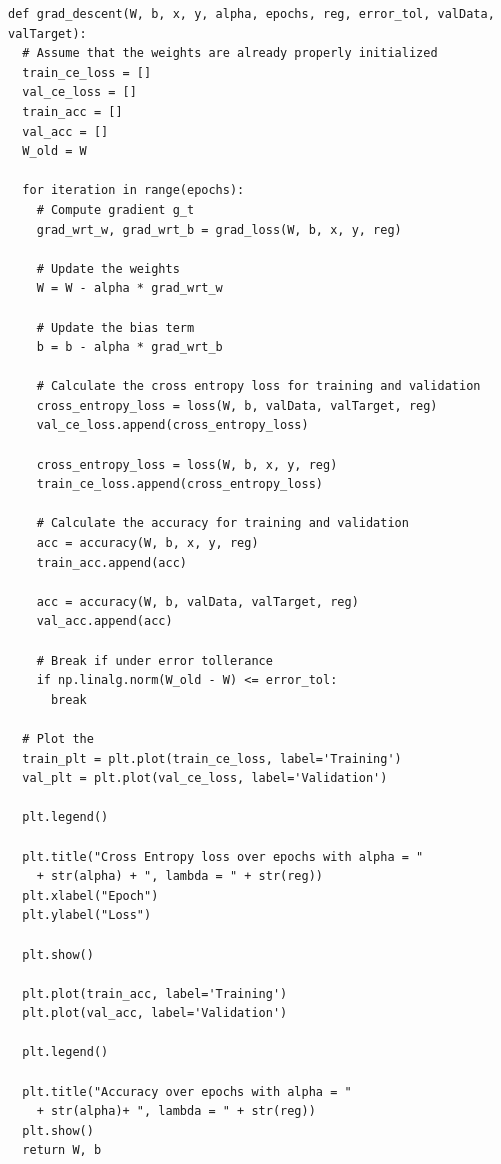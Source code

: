 \documentclass[12pt]{article}
\begin{document}
\begin{verbatim}
def grad_descent(W, b, x, y, alpha, epochs, reg, error_tol, valData, valTarget):
  # Assume that the weights are already properly initialized
  train_ce_loss = []
  val_ce_loss = []
  train_acc = []
  val_acc = []
  W_old = W

  for iteration in range(epochs):
    # Compute gradient g_t
    grad_wrt_w, grad_wrt_b = grad_loss(W, b, x, y, reg)

    # Update the weights
    W = W - alpha * grad_wrt_w

    # Update the bias term
    b = b - alpha * grad_wrt_b

    # Calculate the cross entropy loss for training and validation
    cross_entropy_loss = loss(W, b, valData, valTarget, reg)
    val_ce_loss.append(cross_entropy_loss)

    cross_entropy_loss = loss(W, b, x, y, reg)
    train_ce_loss.append(cross_entropy_loss)
    
    # Calculate the accuracy for training and validation
    acc = accuracy(W, b, x, y, reg)
    train_acc.append(acc)

    acc = accuracy(W, b, valData, valTarget, reg)
    val_acc.append(acc)

    # Break if under error tollerance
    if np.linalg.norm(W_old - W) <= error_tol:
      break
  
  # Plot the 
  train_plt = plt.plot(train_ce_loss, label='Training')
  val_plt = plt.plot(val_ce_loss, label='Validation')

  plt.legend()

  plt.title("Cross Entropy loss over epochs with alpha = " 
    + str(alpha) + ", lambda = " + str(reg))
  plt.xlabel("Epoch")
  plt.ylabel("Loss")

  plt.show()

  plt.plot(train_acc, label='Training')
  plt.plot(val_acc, label='Validation')

  plt.legend()

  plt.title("Accuracy over epochs with alpha = " 
    + str(alpha)+ ", lambda = " + str(reg))
  plt.show()
  return W, b        
\end{verbatim}
\end{document}
